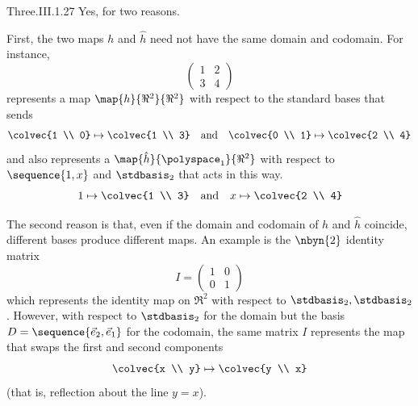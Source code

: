 \begin{ans}{Three.III.1.27}
      Yes, for two reasons.

      First, the two maps $h$ and $\hat{h}$ need not have the same domain
      and codomain.
      For instance,
      \begin{equation*}
        \begin{pmatrix}
          1  &2  \\
          3  &4
        \end{pmatrix}
      \end{equation*}
      represents a map \( \map{h}{\Re^2}{\Re^2} \) with respect to the standard
      bases that sends
      \begin{equation*}
        \colvec{1 \\ 0}\mapsto\colvec{1 \\ 3}
        \quad\text{and}\quad
        \colvec{0 \\ 1}\mapsto\colvec{2 \\ 4}
      \end{equation*}
      and also represents a
      \( \map{\hat{h}}{\polyspace_1}{\Re^2} \) with respect to
      \( \sequence{1,x} \) and \( \stdbasis_2 \) that acts in this way.
      \begin{equation*}
        1\mapsto\colvec{1 \\ 3}
        \quad\text{and}\quad
        x\mapsto\colvec{2 \\ 4}
      \end{equation*}

      The second reason is that, even if the domain and
      codomain of \( h \) and \( \hat{h} \) coincide, different bases produce
      different maps.
      An example is the $\nbyn{2}$ identity matrix
      \begin{equation*}
        I=\begin{pmatrix}
          1  &0  \\
          0  &1
        \end{pmatrix}
      \end{equation*}
      which represents the identity map on $\Re^2$ with respect to
      $\stdbasis_2,\stdbasis_2$.
      However, with respect to $\stdbasis_2$ for the domain but the basis
      $D=\sequence{\vec{e}_2,\vec{e}_1}$ for the codomain,
      the same matrix $I$ represents the map that swaps the first and second
      components
      \begin{equation*}
        \colvec{x \\ y}\mapsto\colvec{y \\ x}
      \end{equation*}
      (that is, reflection about the line $y=x$).
    
\end{ans}
